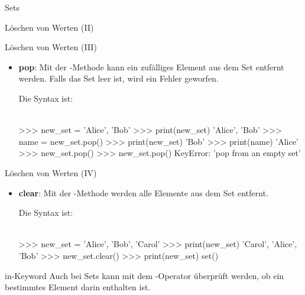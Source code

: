 \begin{subsection}{Sets}
\begin{frame}[fragile]{Löschen von Werten (II)}
\begin{itemize}
            \end{itemize}
        \end{frame}
        
        \begin{frame}[fragile]{Löschen von Werten (III)}
            \begin{itemize}
                \item \textbf{pop}: Mit der -Methode kann ein zufälliges Element aus dem Set entfernt werden. Falls das Set leer ist, wird ein Fehler geworfen.
                
                Die Syntax ist: \\~\
                
                
\begin{pyconcode}
>>> new_set = {'Alice', 'Bob'}
>>> print(new_set)
{'Alice', 'Bob'}
>>> name = new_set.pop()
>>> print(new_set)
{'Bob'}
>>> print(name)
'Alice'
>>> new_set.pop()
>>> new_set.pop()
KeyError: 'pop from an empty set'
\end{pyconcode} 

            \end{itemize}
        \end{frame}
        
        \begin{frame}[fragile]{Löschen von Werten (IV)}
            \begin{itemize}
                \item \textbf{clear}: Mit der -Methode werden alle Elemente aus dem Set entfernt.
                
                Die Syntax ist: \\~\
                
                
\begin{pyconcode}
>>> new_set = {'Alice', 'Bob', 'Carol'}
>>> print(new_set)
{'Carol', 'Alice', 'Bob'}
>>> new_set.clear()
>>> print(new_set)
set()
\end{pyconcode} 

            \end{itemize}
        \end{frame}

        \begin{frame}[fragile]{in-Keyword}
            Auch bei Sets kann mit dem -Operator überprüft werden, ob ein bestimmtes Element darin enthalten ist.
                

\end{frame}
\end{subsection}
